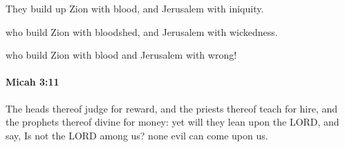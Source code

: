			\begin{versebox}
					\item[BHS] 
					\item[LXX] 
					\item[ASV] They build up Zion with blood, and Jerusalem with iniquity.
					\item[NIV] who build Zion with bloodshed, and Jerusalem with wickedness.
					\item[NRSV] who build Zion with blood and Jerusalem with wrong!
			\end{versebox}

		\paragraph{Micah 3:11} %
			\label{MICAH-3-11}

			The heads thereof judge for reward, and the priests thereof teach for hire, and the prophets thereof divine for money: yet will they lean upon the LORD, and say, Is not the LORD among us? none evil can come upon us.

